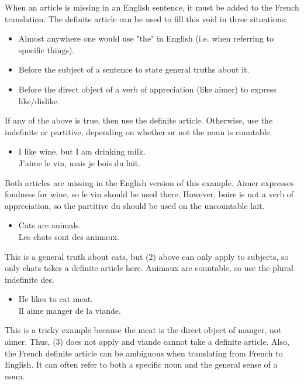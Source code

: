 When an article is missing in an English sentence, it must be added to the French translation. The definite article can be used to fill this void in three situations:

\begin{itemize}
  \item  Almost anywhere one would use "the" in English (i.e. when referring to specific things).
  \item  Before the subject of a sentence to state general truths about it.
  \item  Before the direct object of a verb of appreciation (like aimer) to express like/dislike.
\end{itemize}

If any of the above is true, then use the definite article. Otherwise, use the indefinite or partitive, depending on whether or not the noun is countable.

\begin{itemize}
  \item  I like wine, but I am drinking milk. \\ J'aime le vin, mais je bois du lait.
\end{itemize}

Both articles are missing in the English version of this example. Aimer expresses fondness for wine, so le vin should be used there. However, boire is not a verb of appreciation, so the partitive du should be used on the uncountable lait.

\begin{itemize}
  \item  Cats are animals. \\ Les chats sont des animaux.
\end{itemize}

This is a general truth about cats, but (2) above can only apply to subjects, so only chats takes a definite article here. Animaux are countable, so use the plural indefinite des.

\begin{itemize}
  \item  He likes to eat meat. \\ Il aime manger de la viande.
\end{itemize}

This is a tricky example because the meat is the direct object of manger, not aimer. Thus, (3) does not apply and viande cannot take a definite article.  Also, the French definite article can be ambiguous when translating from French to English. It can often refer to both a specific noun and the general sense of a noun.

